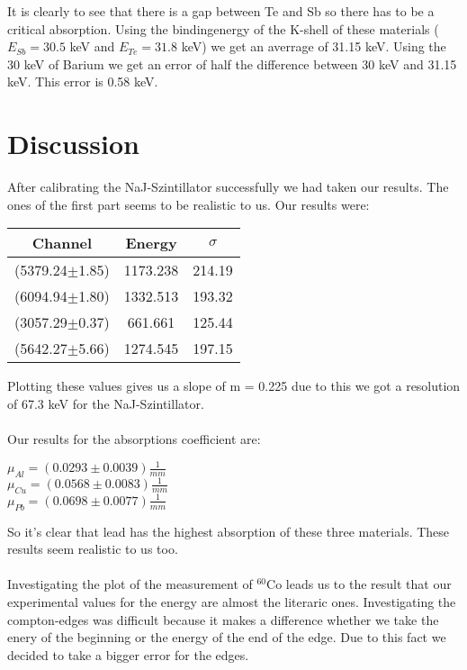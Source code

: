 
It is clearly to see that there is a gap between Te and Sb so there has to be a critical absorption. Using the bindingenergy of the K-shell of these materials ($E_{Sb}=30.5$ keV and $E_{Te}=31.8$ keV) we get an averrage of 31.15 keV. Using the 30 keV of Barium we get an error of half the difference between 30 keV and 31.15 keV. This error is 0.58 keV.

\newpage
\section{Discussion}
After calibrating the NaJ-Szintillator successfully we had taken our results. The ones of the first part seems to be realistic to us. Our results were:
\begin{center}
\begin{tabular}{c|c|c}
Channel & Energy & $\sigma$\\
\hline
(5379.24$\pm$1.85)& 1173.238 & 214.19\\
(6094.94$\pm$1.80) & 1332.513 &  193.32\\	
(3057.29$\pm$0.37) & 661.661 & 125.44\\
(5642.27$\pm$5.66) & 1274.545 & 197.15\\
\end{tabular}
\end{center}

Plotting these values gives us a slope of m = 0.225 due to this we got a resolution of 67.3 keV for the NaJ-Szintillator.\\
\\
Our results for the absorptions coefficient are:\\
\begin{center}
$\mu_{Al} = (0.0293 \pm 0.0039)\frac{1}{mm}$\\
$\mu_{Cu} = (0.0568 \pm 0.0083)\frac{1}{mm}$\\
$\mu_{Pb} = (0.0698 \pm 0.0077)\frac{1}{mm}$\\
\end{center}

So it's clear that lead has the highest absorption of these three materials. These results seem realistic to us too.\\
\\
Investigating the plot of the measurement of $^{60}$Co leads us to the result that our experimental values for the energy are almost the literaric ones. Investigating the compton-edges was difficult because it makes a difference whether we take the enery of the beginning or the energy of the end of the edge. Due to this fact we decided to take a bigger error for the edges.